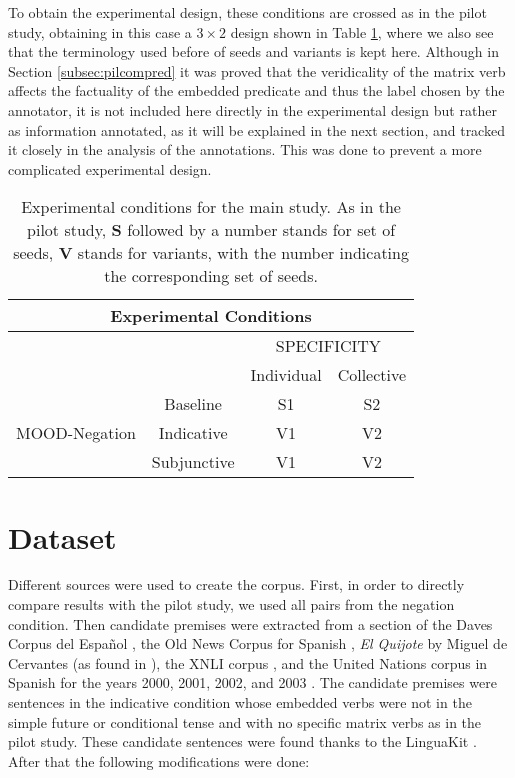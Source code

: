 To obtain the experimental design, these conditions are crossed as in the pilot study, obtaining in this case a $3\times2$ design shown in Table \ref{tab:design}, where we also see that the terminology used before of seeds and variants is kept here. Although in Section \ref{subsec:pilcompred} it was proved that the veridicality of the matrix verb affects the factuality of the embedded predicate and thus the label chosen by the annotator, it is not included here directly in the experimental design but rather as information annotated, as it will be explained in the next section, and tracked it closely in the analysis of the annotations. This was done to prevent a more complicated experimental design.\\

\begin{table}
\centering
\begin{tabular}{|c|c|c|c|}
\hline
\multicolumn{4}{|c|}{Experimental Conditions}\\\hline
                      & &\multicolumn{2}{c|}{SPECIFICITY} \\\cline{1-4} 
                      & &Individual&Collective\\\cline{2-4} 
\multirow{3}{*}{MOOD-Negation} & Baseline & S1 & S2 \\\cline{2-4}
                      & Indicative & V1 & V2 \\\cline{2-4}
                      & Subjunctive & V1 & V2  \\ \cline{2-4}\hline                                                          
\end{tabular}

\caption[Experimental conditions main study.]{Experimental conditions for the main study. As in the pilot study, \textbf{S} followed by a number stands for set of seeds, \textbf{V} stands for variants, with the number indicating the corresponding set of seeds.}
\label{tab:design}
\end{table}

\section{Dataset}
Different sources were used to create the corpus. First, in order to directly compare results with the pilot study, we used all pairs from the negation condition. Then candidate premises were extracted from a section of the Daves Corpus del Español \citep{daves2016}, the Old News Corpus for Spanish \citep{oldnews}, \textit{El Quijote} by Miguel de Cervantes (as found in \citet{jsdario2017}), the XNLI corpus \citep{conneau2018xnli}, and the United Nations corpus in Spanish for the years 2000, 2001, 2002, and 2003 \citep{eisele2010multiun}. The candidate premises were sentences in the indicative condition whose embedded verbs were not in the simple future or conditional tense and with no specific matrix verbs as in the pilot study. These candidate sentences were found thanks to the LinguaKit \citep{Gamallo95}. After that the following modifications were done:\\

